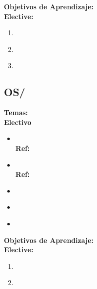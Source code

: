 \noindent \textbf{Objetivos de Aprendizaje:}\\
\noindent \textbf{Elective:}
\begin{enumerate}
	\setcounter{enumi}{0}
	\item \OSFaultToleranceLOExplainTheTheTolerance\xspace[\OSFaultToleranceLOExplainTheTheToleranceLevel]\label{sec:BOK:OSFaultToleranceLOExplainTheTheTolerance}
	\item \OSFaultToleranceLOOutlineThe\xspace[\OSFaultToleranceLOOutlineTheLevel]\label{sec:BOK:OSFaultToleranceLOOutlineThe}
	\item \OSFaultToleranceLOExplainHowSystem\xspace[\OSFaultToleranceLOExplainHowSystemLevel]\label{sec:BOK:OSFaultToleranceLOExplainHowSystem}
\end{enumerate}


\subsection{OS/\OSSystemPerformanceEvaluation}\label{sec:BOK:OSSystemPerformanceEvaluation}
\noindent \textbf{Temas:}\\
\noindent \textbf{Electivo}
\begin{itemize}
	\item \OSSystemPerformanceEvaluationTopicWhy\xspace \\ \textbf{Ref:} \label{sec:BOK:OSSystemPerformanceEvaluationTopicWhy}
	\item \OSSystemPerformanceEvaluationTopicWhat\xspace \\ \textbf{Ref:} \label{sec:BOK:OSSystemPerformanceEvaluationTopicWhat}
	\item \OSSystemPerformanceEvaluationTopicSystems\label{sec:BOK:OSSystemPerformanceEvaluationTopicSystems}
	\item \OSSystemPerformanceEvaluationTopicEvaluation\label{sec:BOK:OSSystemPerformanceEvaluationTopicEvaluation}
	\item \OSSystemPerformanceEvaluationTopicHow\label{sec:BOK:OSSystemPerformanceEvaluationTopicHow}
\end{itemize}


\noindent \textbf{Objetivos de Aprendizaje:}\\
\noindent \textbf{Elective:}
\begin{enumerate}
	\setcounter{enumi}{0}
	\item \OSSystemPerformanceEvaluationLODescribeTheUsedHow\xspace[\OSSystemPerformanceEvaluationLODescribeTheUsedHowLevel]\label{sec:BOK:OSSystemPerformanceEvaluationLODescribeTheUsedHow}
	\item \OSSystemPerformanceEvaluationLOExplainTheModels\xspace[\OSSystemPerformanceEvaluationLOExplainTheModelsLevel]\label{sec:BOK:OSSystemPerformanceEvaluationLOExplainTheModels}
\end{enumerate}




